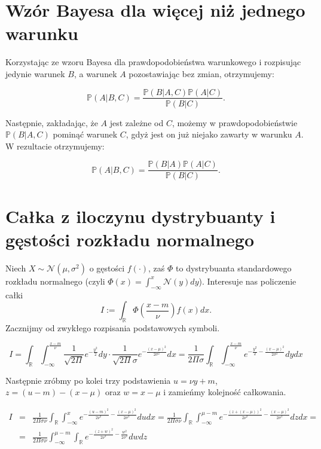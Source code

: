 \documentclass{mini}
\begin{document}
\section{Wzór Bayesa dla więcej niż jednego warunku}\label{app1}

Korzystając ze wzoru Bayesa dla prawdopodobieństwa warunkowego i rozpisując jedynie warunek $B$, a warunek $A$ pozostawiając bez zmian, otrzymujemy:

$$
\mathbb{P}(A | B, C) 
=
\frac{
\mathbb{P}(B | A, C)
\mathbb{P}(A | C)
}{
\mathbb{P}(B | C)
}. 
$$

Następnie, zakładając, że $A$ jest zależne od $C$, możemy w prawdopodobieństwie $\mathbb{P}(B | A, C)$ pominąć warunek $C$, gdyż jest on już niejako zawarty w warunku $A$. W rezultacie otrzymujemy:

$$
\mathbb{P}(A | B, C) 
=
\frac{
\mathbb{P}(B | A)
\mathbb{P}(A | C)
}{
\mathbb{P}(B | C)
}. 
$$

\section{Całka z iloczynu dystrybuanty i gęstości rozkładu normalnego}\label{app2}

Niech $X \sim \mathcal{N}(\mu, \sigma^2)$ o gęstości $f(\cdot)$, zaś $\Phi$ to dystrybuanta standardowego rozkładu normalnego (czyli $\Phi(x)=\int_{-\infty}^x \mathcal{N}(y) dy$). Interesuje nas policzenie całki
$$
I := \int_\mathbb{R} \Phi(\frac{x-m}{\nu})f(x) dx.
$$
Zacznijmy od zwykłego rozpisania podstawowych symboli.

$$
I = \int_\mathbb{R}\int_{-\infty}^{\frac{x-m}{\nu}} \frac{1}{\sqrt{2\Pi}}e^{-\frac{y^2}{2}} dy \cdot \frac{1}{\sqrt{2\Pi}\sigma}e^{-\frac{(x-\mu)^2}{2\sigma^2}} dx
= 
\frac{1}{2\Pi\sigma}\int_\mathbb{R}\int_{-\infty}^{\frac{x-m}{\nu}} e^{-\frac{y^2}{2} - \frac{(x-\mu)^2}{2\sigma^2}} dy dx
$$

Następnie zróbmy po kolei trzy podstawienia $u = \nu y+m$, $z=(u-m)-(x-\mu)$ oraz $w=x-\mu$ i zamieńmy kolejność całkowania. 

\begin{eqnarray*}
I &=&
\frac{1}{2\Pi\sigma\nu}\int_\mathbb{R}\int_{-\infty}^{x} e^{-\frac{(u-m)^2}{2\nu^2} - \frac{(x-\mu)^2}{2\sigma^2}} du dx
=
\frac{1}{2\Pi\sigma\nu}\int_\mathbb{R}\int_{-\infty}^{\mu-m} e^{-\frac{(z+(x-\mu))^2}{2\nu^2} - \frac{(x-\mu)^2}{2\sigma^2}} dz dx=\\
&=&
\frac{1}{2\Pi\sigma\nu}\int_{-\infty}^{\mu-m}\int_\mathbb{R} e^{-\frac{(z+w)^2}{2\nu^2} - \frac{w^2}{2\sigma^2}} dw dz
\end{eqnarray*}
\end{document}
